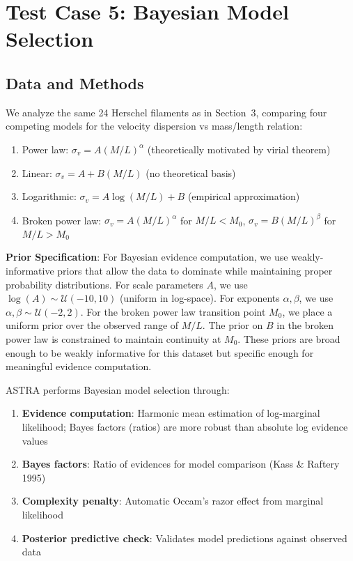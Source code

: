 \documentclass[usenatbib]{rasti}
\begin{document}
\section{Test Case 5: Bayesian Model Selection}

\subsection{Data and Methods}

We analyze the same 24 Herschel filaments as in Section~3, comparing four competing models for the velocity dispersion vs mass/length relation:
\begin{enumerate}
\item Power law: $\sigma_v = A (M/L)^\alpha$ (theoretically motivated by virial theorem)
\item Linear: $\sigma_v = A + B (M/L)$ (no theoretical basis)
\item Logarithmic: $\sigma_v = A \log(M/L) + B$ (empirical approximation)
\item Broken power law: $\sigma_v = A (M/L)^\alpha$ for $M/L < M_0$, $\sigma_v = B (M/L)^\beta$ for $M/L > M_0$
\end{enumerate}

\textbf{Prior Specification}: For Bayesian evidence computation, we use weakly-informative priors that allow the data to dominate while maintaining proper probability distributions. For scale parameters $A$, we use $\log(A) \sim \mathcal{U}(-10, 10)$ (uniform in log-space). For exponents $\alpha, \beta$, we use $\alpha, \beta \sim \mathcal{U}(-2, 2)$. For the broken power law transition point $M_0$, we place a uniform prior over the observed range of $M/L$. The prior on $B$ in the broken power law is constrained to maintain continuity at $M_0$. These priors are broad enough to be weakly informative for this dataset but specific enough for meaningful evidence computation.

ASTRA performs Bayesian model selection through:
\begin{enumerate}
\item \textbf{Evidence computation}: Harmonic mean estimation of log-marginal likelihood; Bayes factors (ratios) are more robust than absolute log evidence values
\item \textbf{Bayes factors}: Ratio of evidences for model comparison (Kass \& Raftery 1995)
\item \textbf{Complexity penalty}: Automatic Occam's razor effect from marginal likelihood
\item \textbf{Posterior predictive check}: Validates model predictions against observed data
\end{enumerate}
\end{document}
